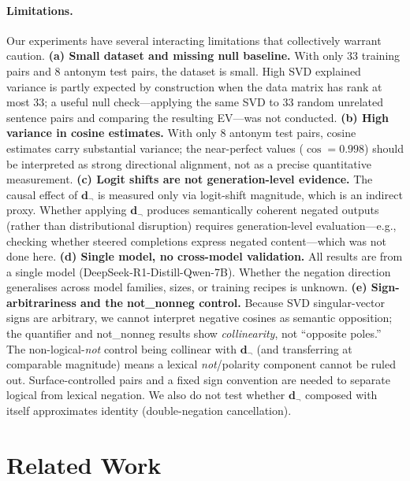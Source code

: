\documentclass{article}
\begin{document}
\paragraph{Limitations.}
Our experiments have several interacting limitations that collectively warrant caution.
\textbf{(a) Small dataset and missing null baseline.}
With only 33 training pairs and 8 antonym test pairs, the dataset is small.
High SVD explained variance is partly expected by construction when the data matrix has rank at most 33; a useful null check---applying the same SVD to 33 random unrelated sentence pairs and comparing the resulting EV---was not conducted.
\textbf{(b) High variance in cosine estimates.}
With only 8 antonym test pairs, cosine estimates carry substantial variance; the near-perfect values ($\cos = 0.998$) should be interpreted as strong directional alignment, not as a precise quantitative measurement.
\textbf{(c) Logit shifts are not generation-level evidence.}
The causal effect of $\mathbf{d}_{\neg}$ is measured only via logit-shift magnitude, which is an indirect proxy. Whether applying $\mathbf{d}_{\neg}$ produces semantically coherent negated outputs (rather than distributional disruption) requires generation-level evaluation---e.g., checking whether steered completions express negated content---which was not done here.
\textbf{(d) Single model, no cross-model validation.}
All results are from a single model (DeepSeek-R1-Distill-Qwen-7B). Whether the negation direction generalises across model families, sizes, or training recipes is unknown.
\textbf{(e) Sign-arbitrariness and the not\_nonneg control.}
Because SVD singular-vector signs are arbitrary, we cannot interpret negative cosines as semantic opposition; the quantifier and not\_nonneg results show \emph{collinearity}, not ``opposite poles.'' The non-logical-\textit{not} control being collinear with $\mathbf{d}_{\neg}$ (and transferring at comparable magnitude) means a lexical \textit{not}/polarity component cannot be ruled out. Surface-controlled pairs and a fixed sign convention are needed to separate logical from lexical negation.
We also do not test whether $\mathbf{d}_{\neg}$ composed with itself approximates identity (double-negation cancellation).

\section{Related Work}
\label{sec:related}
\end{document}
